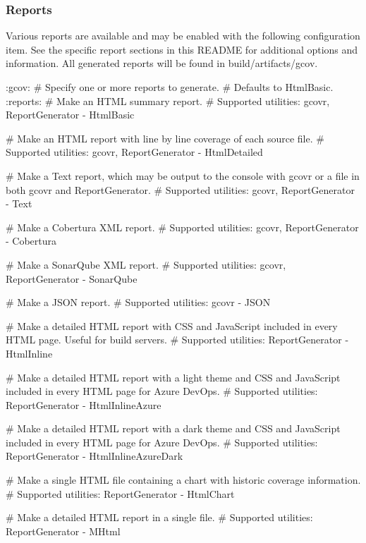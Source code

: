\subsubsection*{Reports}

Various reports are available and may be enabled with the following configuration item. See the specific report sections in this R\+E\+A\+D\+ME for additional options and information. All generated reports will be found in {\ttfamily build/artifacts/gcov}.


\begin{DoxyCode}
:gcov:
  # Specify one or more reports to generate.
  # Defaults to HtmlBasic.
  :reports:
    # Make an HTML summary report.
    # Supported utilities: gcovr, ReportGenerator
    - HtmlBasic

    # Make an HTML report with line by line coverage of each source file.
    # Supported utilities: gcovr, ReportGenerator
    - HtmlDetailed

    # Make a Text report, which may be output to the console with gcovr or a file in both gcovr and
       ReportGenerator.
    # Supported utilities: gcovr, ReportGenerator
    - Text

    # Make a Cobertura XML report.
    # Supported utilities: gcovr, ReportGenerator
    - Cobertura

    # Make a SonarQube XML report.
    # Supported utilities: gcovr, ReportGenerator
    - SonarQube

    # Make a JSON report.
    # Supported utilities: gcovr
    - JSON

    # Make a detailed HTML report with CSS and JavaScript included in every HTML page. Useful for build
       servers.
    # Supported utilities: ReportGenerator
    - HtmlInline

    # Make a detailed HTML report with a light theme and CSS and JavaScript included in every HTML page for
       Azure DevOps.
    # Supported utilities: ReportGenerator
    - HtmlInlineAzure

    # Make a detailed HTML report with a dark theme and CSS and JavaScript included in every HTML page for
       Azure DevOps.
    # Supported utilities: ReportGenerator
    - HtmlInlineAzureDark

    # Make a single HTML file containing a chart with historic coverage information.
    # Supported utilities: ReportGenerator
    - HtmlChart

    # Make a detailed HTML report in a single file.
    # Supported utilities: ReportGenerator
    - MHtml


\end{DoxyCode}
